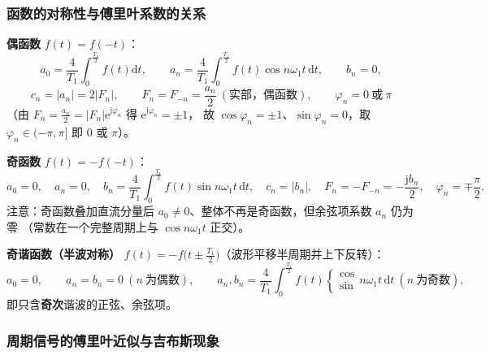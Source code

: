 \subsubsection{函数的对称性与傅里叶系数的关系}

\textbf{偶函数} $f(t)=f(-t)$：
\begin{equation}
a_0=\frac{4}{T_1}\int_{0}^{\frac{T_1}{2}}f(t)\mathrm{d}t,\qquad
a_n=\frac{4}{T_1}\int_{0}^{\frac{T_1}{2}}f(t)\cos n\omega_1t\,\mathrm{d}t,\qquad b_n=0,
\end{equation}
\begin{equation}
c_n=|a_n|=2|F_n|,\qquad F_n=F_{-n}=\frac{a_n}{2}\ (\text{实部，偶函数}),\qquad \varphi_n=0\ \text{或}\ \pi
\end{equation}
（由 $F_n=\frac{a_n}{2}=|F_n|\mathrm{e}^{\mathrm{j}\varphi_n}$ 得 $\mathrm{e}^{\mathrm{j}\varphi_n}=\pm1$，
故 $\cos\varphi_n=\pm1$、$\sin\varphi_n=0$，取 $\varphi_n\in(-\pi,\pi]$ 即 $0$ 或 $\pi$）。

\textbf{奇函数} $f(t)=-f(-t)$：
\begin{equation}
a_0=0,\quad a_n=0,\quad b_n=\frac{4}{T_1}\int_{0}^{\frac{T_1}{2}}f(t)\sin n\omega_1t\,\mathrm{d}t,\quad
c_n=|b_n|,\quad F_n=-F_{-n}=-\frac{\mathrm{j}b_n}{2},\quad \varphi_n=\mp\frac{\pi}{2}.
\end{equation}
注意：奇函数叠加直流分量后 $a_0\neq0$、整体不再是奇函数，但余弦项系数 $a_n$ 仍为零
（常数在一个完整周期上与 $\cos n\omega_1t$ 正交）。

\textbf{奇谐函数（半波对称）} $f(t)=-f\big(t\pm\frac{T_1}{2}\big)$（波形平移半周期并上下反转）：
\begin{equation}
a_0=0,\qquad a_n=b_n=0\ (n\ \text{为偶数}),\qquad
a_n,b_n=\frac{4}{T_1}\int_{0}^{\frac{T_1}{2}}f(t)\begin{cases}\cos\\ \sin\end{cases}n\omega_1t\,\mathrm{d}t
\ (n\ \text{为奇数}),
\end{equation}
即只含\textbf{奇次}谐波的正弦、余弦项。

\subsubsection{周期信号的傅里叶近似与吉布斯现象}

